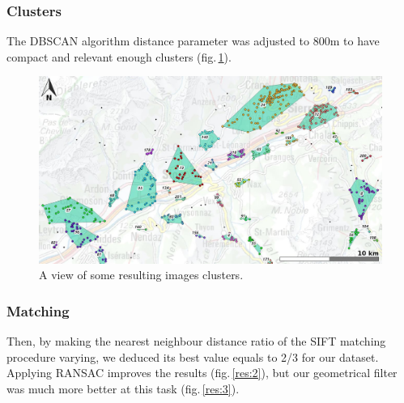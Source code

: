 \documentclass[fleqn,10pt]{wlpeerj} %
\begin{document}
\subsubsection*{Clusters}
The DBSCAN algorithm distance parameter was adjusted to 800m to have compact and
relevant enough clusters (fig.\,\ref{clusters}).

\begin{figure}[H]
\centering
\includegraphics[width=0.8\linewidth]{clusters2.jpg}
\caption{A view of some resulting images clusters.}
\label{clusters}
\end{figure}


\subsubsection*{Matching}
Then, by making the nearest neighbour distance ratio of the SIFT matching 
procedure varying, we deduced its best value equals to 2/3 for our dataset.
Applying RANSAC improves the results (fig.\,\ref{res:2}), but our geometrical 
filter was much more better at this task (fig.\,\ref{res:3}).
\end{document}
